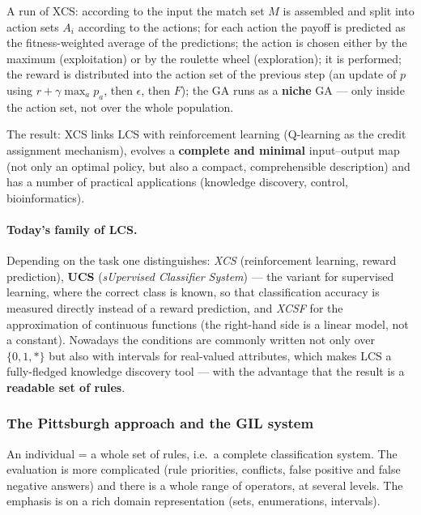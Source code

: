 \documentclass[11pt,a4paper]{article}
\theoremstyle{definition}
\begin{document}
A run of XCS: according to the input the match set $M$ is assembled and split
into action sets $A_i$ according to the actions; for each action the payoff is
predicted as the fitness-weighted average of the predictions; the action is
chosen either by the maximum (exploitation) or by the roulette wheel
(exploration); it is performed; the reward is distributed into the action set of
the previous step (an update of $p$ using $r + \gamma \max_a p_a$, then
$\epsilon$, then $F$); the GA runs as a \textbf{niche} GA --- only inside the
action set, not over the whole population.

The result: XCS links LCS with reinforcement learning (Q-learning as the credit
assignment mechanism), evolves a \textbf{complete and minimal} input--output map
(not only an optimal policy, but also a compact, comprehensible description) and
has a number of practical applications (knowledge discovery, control,
bioinformatics).

\paragraph{Today's family of LCS.} Depending on the task one distinguishes:
\emph{XCS} (reinforcement learning, reward prediction),
\textbf{UCS} (\emph{sUpervised Classifier System}) --- the variant for
supervised learning, where the correct class is known, so that classification
accuracy is measured directly instead of a reward prediction,
and \emph{XCSF} for the approximation of continuous functions (the right-hand
side is a linear model, not a constant). Nowadays the conditions are commonly
written not only over $\{0,1,*\}$ but also with intervals for real-valued
attributes, which makes LCS a fully-fledged knowledge discovery tool --- with
the advantage that the result is a \textbf{readable set of rules}.

\subsubsection{The Pittsburgh approach and the GIL system}

An individual = a whole set of rules, i.e.\ a complete classification system.
The evaluation is more complicated (rule priorities, conflicts, false positive
and false negative answers) and there is a whole range of operators, at several
levels. The emphasis is on a rich domain representation (sets, enumerations,
intervals).
\end{document}
